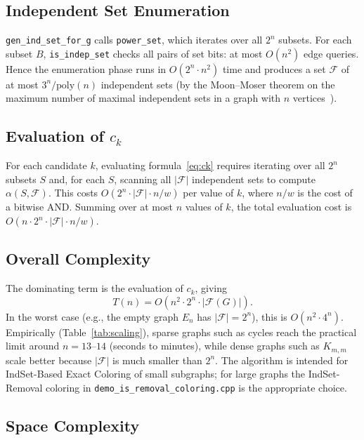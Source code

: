 \documentclass[11pt]{article}
\begin{document}
\subsection{Independent Set Enumeration}

\begin{sloppypar}
\texttt{gen\_ind\_set\_for\_g} calls \texttt{power\_set}, which iterates over
all $2^n$ subsets.  For each subset $B$, \texttt{is\_indep\_set} checks all
pairs of set bits: at most $O(n^2)$ edge queries.  Hence the enumeration phase
runs in $O(2^n \cdot n^2)$ time and produces a set $\mathcal{F}$ of at most
$3^n / \text{poly}(n)$ independent sets (by the Moon--Moser theorem on the
maximum number of maximal independent sets in a graph with $n$
vertices~\cite{MoonMoser1965}).
\end{sloppypar}

\subsection{Evaluation of $c_k$}

For each candidate $k$, evaluating formula~\eqref{eq:ck} requires iterating
over all $2^n$ subsets $S$ and, for each $S$, scanning all $|\mathcal{F}|$
independent sets to compute $\alpha(S, \mathcal{F})$.  This costs
$O(2^n \cdot |\mathcal{F}| \cdot n/w)$ per value of $k$, where $n/w$ is the
cost of a bitwise AND.  Summing over at most $n$ values of $k$, the total
evaluation cost is $O(n \cdot 2^n \cdot |\mathcal{F}| \cdot n/w)$.

\subsection{Overall Complexity}

The dominating term is the evaluation of $c_k$, giving
\[
  T(n) = O\!\left(n^2 \cdot 2^n \cdot |\mathcal{F}(G)|\right).
\]
In the worst case (e.g., the empty graph $E_n$ has $|\mathcal{F}| = 2^n$),
this is $O(n^2 \cdot 4^n)$.  Empirically (Table~\ref{tab:scaling}), sparse
graphs such as cycles reach the practical limit around $n = 13$--$14$ (seconds
to minutes), while dense graphs such as $K_{m,m}$ scale better because
$|\mathcal{F}|$ is much smaller than $2^n$.  The algorithm is intended for
IndSet-Based Exact Coloring of small subgraphs; for large graphs the IndSet-Removal
coloring in \texttt{demo\_is\_removal\_coloring.cpp} is the appropriate choice.

\subsection{Space Complexity}
\end{document}
